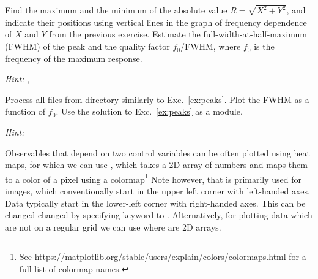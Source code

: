 \begin{exercise}
    \label{ex:peaks}
    Find the maximum and the minimum of the absolute value $R = \sqrt{X^2 + Y^2}$, and indicate their positions using vertical lines in the graph of frequency dependence of $X$ and $Y$ from the previous exercise. Estimate the full-width-at-half-maximum (FWHM) of the peak and the quality factor $f_0$/FWHM, where $f_0$ is the frequency of the maximum response. 
    
    \emph{Hint:} , 
\end{exercise}
\begin{exercise}
    \label{ex:peaks-all}
    Process all files from  directory similarly to Exc.~\ref{ex:peaks}. Plot the FWHM as a function of $f_0$. Use the solution to Exc.~\ref{ex:peaks} as a module.
    
    \emph{Hint:} 
\end{exercise}

Observables that depend on two control variables can be often plotted using heat maps, for which we can use , which takes a 2D array of numbers and maps them to a color of a pixel using a colormap\footnote{See \url{https://matplotlib.org/stable/users/explain/colors/colormaps.html} for a full list of colormap names.} Note however, that  is primarily used for images, which conventionally start in the upper left corner with left-handed axes. Data typically start in the lower-left corner with right-handed axes. This can be changed changed by specifying  keyword to . Alternatively, for plotting data which are not on a regular grid we can use  where  are 2D arrays.


